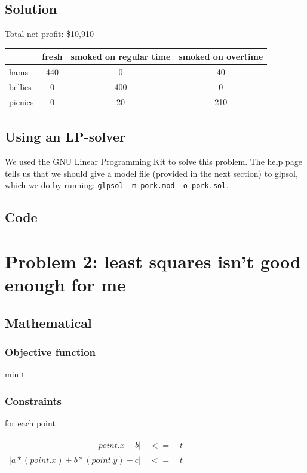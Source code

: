 \documentclass[letterpaper,10pt]{article}
\begin{document}
	\newpage
	\subsection{Solution}
		Total net profit: \$10,910 \\

		\begin{tabular}{|l|ccc|} \hline
		& fresh & smoked on regular time & smoked on overtime \\ \hline
		hams    & 440 & 0   & 40 \\
		bellies & 0   & 400 & 0 \\
		picnics & 0   & 20  & 210 \\ \hline
		\end{tabular}

	\subsection{Using an LP-solver}
		We used the GNU Linear Programming Kit to solve this problem. The help page tells us that we should give a model file (provided in the next section) to glpsol, which we do by running: {\tt glpsol -m pork.mod -o pork.sol}.

	\subsection{Code}
		


	\section{Problem 2: least squares isn’t good enough for me}
		
	\subsection{Mathematical}
	\subsubsection{Objective function} 
	min t

	\subsubsection{Constraints}
	for each point

	\begin{tabular}{rcl}
		$|point.x - b|$&$ <= $&$t$\\
		$|a*(point.x)+b*(point.y)-c|$&$ <= $&$t$
	\end{tabular}
\end{document}
